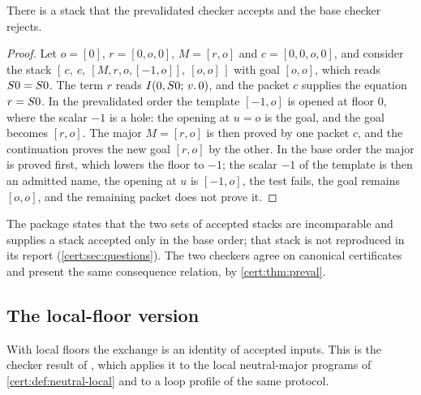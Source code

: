 \begin{proposition}\label{cert:prop:incomparable}
There is a stack that the prevalidated checker accepts and the base checker
rejects.
\end{proposition}
\begin{proof}
Let $o=[0]$, $r=[0,o,0]$, $M=[r,o]$ and $c=[0,0,o,0]$, and consider the stack
$[\,c,\ c,\ [M,r,o,[-1,o]],\ [o,o]\,]$ with goal $[o,o]$, which reads
$S 0=S 0$. The term $r$ reads $I(0,S 0;\,v.\,0)$, and the packet $c$
supplies the equation $r=S 0$. In the prevalidated order the template
$[-1,o]$ is opened at floor $0$, where the scalar $-1$ is a hole: the opening
at $u=o$ is the goal, and the goal becomes $[r,o]$. The major $M=[r,o]$ is
then proved by one packet $c$, and the continuation proves the new goal
$[r,o]$ by the other. In the base order the major is proved first, which
lowers the floor to $-1$; the scalar $-1$ of the template is then an admitted
name, the opening at $u$ is $[-1,o]$, the test fails, the goal remains
$[o,o]$, and the remaining packet does not prove it.
\end{proof}

The package states that the two sets of accepted stacks are incomparable and
supplies a stack accepted only in the base order; that stack is not
reproduced in its report (\cref{cert:sec:questions}). The two checkers agree
on canonical certificates and present the same consequence relation, by
\cref{cert:thm:preval}.

\subsection{The local-floor version}

With local floors the exchange is an identity of accepted inputs. This is the
checker result of , which applies it to the local
neutral-major programs of \cref{cert:def:neutral-local} and to a loop profile
of the same protocol.

